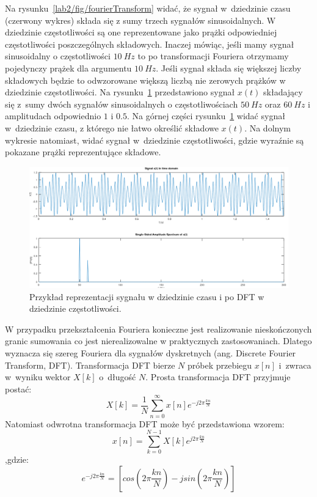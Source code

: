 Na rysunku~\ref{lab2/fig/fourierTransform} widać, że sygnał w~dziedzinie czasu (czerwony wykres) składa się z sumy trzech sygnałów sinusoidalnych. W dziedzinie częstotliwości są one reprezentowane jako prążki odpowiedniej częstotliwości poszczególnych składowych. Inaczej mówiąc, jeśli mamy sygnał sinusoidalny o częstotliwości $10~Hz$ to po transformacji Fouriera otrzymamy pojedynczy prążek dla argumentu $10~Hz$. Jeśli sygnał składa się większej liczby składowych będzie to odwzorowane większą liczbą nie zerowych prążków w dziedzinie częstotliwości. Na rysunku~\ref{lab2/fig/signalInTimeAndFrequencyDomain} przedstawiono sygnał $x(t)$ składający się z~sumy dwóch sygnałów sinusoidalnych o częstotliwościach $50~Hz$ oraz $60~Hz$ i amplitudach odpowiednio $1$ i $0.5$. Na górnej części rysunku~\ref{lab2/fig/signalInTimeAndFrequencyDomain} widać sygnał w~dziedzinie czasu, z którego nie łatwo określić składowe $x(t)$. Na dolnym wykresie natomiast, widać sygnał w~dziedzinie częstotliwości, gdzie wyraźnie są pokazane prążki reprezentujące składowe.

\begin{figure}[hbt!]
	\centering
	\includegraphics[width=0.9\linewidth]{images/signalInTimeAndFrequencyDomain.png}
	\caption{Przykład reprezentacji sygnału w dziedzinie czasu i po DFT w dziedzinie częstotliwości.}
	\label{lab2/fig/signalInTimeAndFrequencyDomain}
\end{figure}

W przypadku przekształcenia Fouriera konieczne jest realizowanie nieskończonych granic sumowania co jest nierealizowalne w praktycznych zastosowaniach. Dlatego wyznacza się szereg Fouriera dla sygnałów dyskretnych (ang. Discrete Fourier Transform, DFT). Transformacja DFT bierze $N$ próbek przebiegu $x[n]$ i~zwraca w~wyniku wektor $X[k]$ o~długość $N$. Prosta transformacja DFT przyjmuje postać:
\begin{equation}
	X[k] = \frac{1}{N} \sum_{n=0}^{\infty} x[n] e^{-j2\pi \frac{kn}{N}}
\end{equation}
Natomiast odwrotna transformacja DFT może być przedstawiona wzorem:
\begin{equation}
	x[n] = \sum_{k=0}^{N-1} X[k] e^{j2\pi \frac{kn}{N}}
\end{equation}
,gdzie:
\begin{equation}
	e^{-j2\pi \frac{kn}{N}} = [cos(2\pi \frac{kn}{N}) - jsin(2\pi \frac{kn}{N})]
\end{equation}


